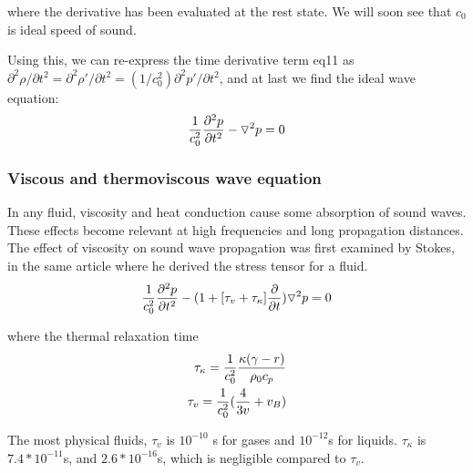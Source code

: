 \documentclass{Note}
\begin{document}
where the derivative has been evaluated at the rest state. We will soon see that $c_0$ is ideal speed of sound.

Using this, we can re-express the time derivative term eq11 as $\partial^2 \rho/\partial t^2=\partial^2 \rho'/\partial t^2=(1/c_0^2)\partial^2 p'/\partial t^2$, and at last we find the ideal wave equation:
\begin{equation}
\begin{aligned}
{1\over c_0^2}{\partial^2 p\over \partial t^2}-\triangledown^2p=0
\end{aligned}
\end{equation}

\subsubsection{Viscous and thermoviscous wave equation}
In any fluid, viscosity and heat conduction cause some absorption of sound waves. These effects become relevant at high frequencies and long propagation distances. The effect of viscosity on sound wave propagation was first examined by Stokes, in the same article where he derived the stress tensor for a fluid.
\begin{equation}
\begin{aligned}
{1\over c_0^2}{\partial^2 p\over \partial t^2}-(1+[\tau_v+\tau_\kappa]{\partial \over \partial t})\triangledown^2p=0
\end{aligned}
\end{equation}

where the thermal relaxation time 
\begin{equation}
\begin{aligned}
\tau_\kappa ={1\over c_0^2}{\kappa (\gamma-r)\over \rho_0 c_p}\\
\tau_v={1\over c_0^2}({4\over 3 v}+v_B)
\end{aligned}
\end{equation}

The most physical fluids, $\tau_v$ is $10^{-10}$ s for gases and $10^{-12}$s for liquids. $\tau_\kappa$ is $7.4*10^{-11}$s, and $2.6*10^{-16}$s, which is negligible compared to $\tau_v$.
\end{document}

